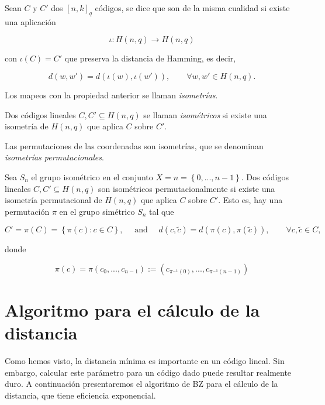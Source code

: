 Sean $C$ y $C'$ dos $[n,k]_q$ códigos, se dice que son de la misma cualidad si existe una aplicación

$$\iota : H(n,q) \rightarrow H(n,q)$$

con $\iota(C) = C'$ que preserva la distancia de Hamming, es decir, 

$$d(w,w') = d(\iota (w), \iota(w')), \qquad \forall w,w' \in H(n,q).$$

Los mapeos con la propiedad anterior se llaman \emph{isometrías}.

\begin{definition}
    Dos códigos lineales $C, C' \subseteq H(n,q)$ se llaman \emph{isométricos} si existe una isometría de $H(n,q)$ que aplica $C$ sobre $C'$.
\end{definition}

Las permutaciones de las coordenadas son isometrías, que se denominan \emph{isometrías permutacionales}.

\begin{definition}
    Sea $S_n$ el grupo isométrico en el conjunto $X = n = \left\{ 0,..., n-1 \right\}$. Dos códigos lineales $C, C' \subseteq H(n,q)$ son isométricos permutacionalmente si existe una isometría permutacional de $H(n,q)$ que aplica $C$ sobre $C'$. Esto es, hay una permutación $\pi$ en el grupo simétrico $S_n$ tal que 

    $$ C' = \pi (C) = \left\{ \pi(c) : c \in C \right\}, \quad \text{ and } \quad d(c, \tilde{c}) = d(\pi(c), \pi(\tilde{c})), \qquad \forall c,\tilde{c} \in C,$$ 

    donde
    
    $$\pi(c) = \pi(c_0,...,c_{n-1}) := \left( c_{\pi ^{-1} (0)}, ..., c_{\pi ^{-1} (n-1)} \right)$$
\end{definition}

\section{Algoritmo para el cálculo de la distancia}

Como hemos visto, la distancia mínima es importante en un código lineal. Sin embargo, calcular este parámetro para un código dado puede resultar realmente duro. A continuación presentaremos el algoritmo de BZ para el cálculo de la distancia, que tiene eficiencia exponencial.

